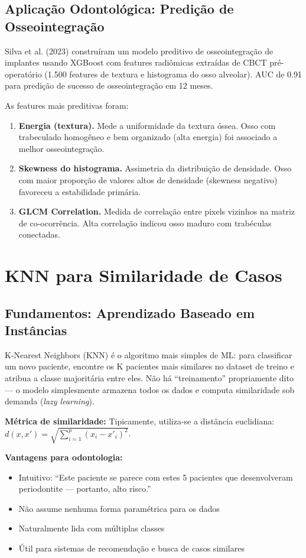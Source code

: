 \subsection{Aplicação Odontológica: Predição de Osseointegração}

Silva et al. (2023) \cite{ODT-056} construíram um modelo preditivo de osseointegração de implantes usando XGBoost com features radiômicas extraídas de CBCT pré-operatório (1.500 features de textura e histograma do osso alveolar). AUC de 0.91 para predição de sucesso de osseointegração em 12 meses.

As features mais preditivas foram:
\begin{enumerate}
    \item \textbf{Energia (textura).} Mede a uniformidade da textura óssea. Osso com trabeculado homogêneo e bem organizado (alta energia) foi associado a melhor osseointegração.
    \item \textbf{Skewness do histograma.} Assimetria da distribuição de densidade. Osso com maior proporção de valores altos de densidade (skewness negativo) favoreceu a estabilidade primária.
    \item \textbf{GLCM Correlation.} Medida de correlação entre pixels vizinhos na matriz de co-ocorrência. Alta correlação indicou osso maduro com trabéculas conectadas.
\end{enumerate}

\section{KNN para Similaridade de Casos}

\subsection{Fundamentos: Aprendizado Baseado em Instâncias}

K-Nearest Neighbors (KNN)  é o algoritmo mais simples de ML: para classificar um novo paciente, encontre os K pacientes mais similares no dataset de treino e atribua a classe majoritária entre eles. Não há ``treinamento'' propriamente dito — o modelo simplesmente armazena todos os dados e computa similaridade sob demanda (\textit{lazy learning}).

\textbf{Métrica de similaridade:} Tipicamente, utiliza-se a distância euclidiana: $d(x, x') = \sqrt{\sum_{i=1}^p (x_i - x'_i)^2}$.

\textbf{Vantagens para odontologia:}
\begin{itemize}
    \item Intuitivo: ``Este paciente se parece com estes 5 pacientes que desenvolveram periodontite — portanto, alto risco.''
    \item Não assume nenhuma forma paramétrica para os dados
    \item Naturalmente lida com múltiplas classes
    \item Útil para sistemas de recomendação e busca de casos similares
\end{itemize}


